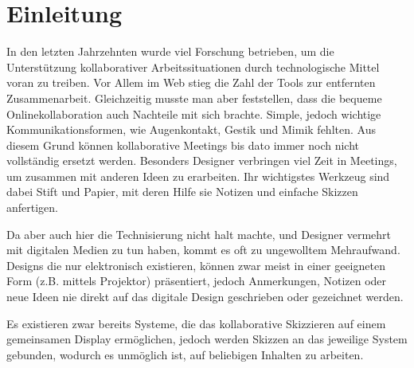 \cleardoublepage
{} %

\hfill

\vfill

\begingroup
\let\cleardoublepage\relax
\chapter*{Einleitung} \label{app:introduction}
In den letzten Jahrzehnten wurde viel Forschung betrieben, um die Unterstützung kollaborativer Arbeitssituationen durch technologische Mittel voran zu treiben. Vor Allem im Web stieg die Zahl der Tools zur entfernten Zusammenarbeit. Gleichzeitig musste man aber feststellen, dass die bequeme Onlinekollaboration auch Nachteile mit sich brachte. Simple, jedoch wichtige Kommunikationsformen, wie Augenkontakt, Gestik und Mimik fehlten. Aus diesem Grund können kollaborative Meetings bis dato immer noch nicht vollständig ersetzt werden. Besonders Designer verbringen viel Zeit in Meetings, um zusammen mit anderen Ideen zu erarbeiten. Ihr wichtigstes Werkzeug sind dabei Stift und Papier, mit deren Hilfe sie Notizen und einfache Skizzen anfertigen.

Da aber auch hier die Technisierung nicht halt machte, und Designer vermehrt mit digitalen Medien zu tun haben, kommt es oft zu ungewolltem Mehraufwand. Designs die nur elektronisch existieren, können zwar meist in einer geeigneten Form (z.B. mittels Projektor) präsentiert, jedoch Anmerkungen, Notizen oder neue Ideen nie direkt auf das digitale Design geschrieben oder gezeichnet werden. 

Es existieren zwar bereits Systeme, die das kollaborative Skizzieren auf einem gemeinsamen Display ermöglichen, jedoch werden Skizzen an das jeweilige System gebunden, wodurch es unmöglich ist, auf beliebigen Inhalten zu arbeiten.

